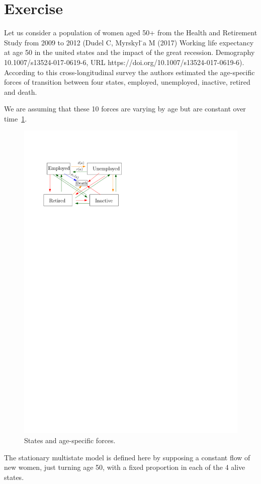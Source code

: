 \documentclass[11pt,letterpaper]{article}
\begin{document}
% 
% 
% 
% 
% 
\section*{Exercise }
Let us consider a population of women aged 50+ from the Health and
Retirement Study from 2009 to 2012 (Dudel C, Myrskyl ̈a M (2017)
Working life expectancy at age 50 in the united states and the impact
of the great recession. Demography 10.1007/s13524-017-0619-6, URL
https://doi.org/10.1007/s13524-017-0619-6). According to this
cross-longitudinal survey the authors estimated the age-specific forces of
transition between four states, employed, unemployed, inactive,
retired and death.

We are assuming that these 10 forces are varying by age but are constant
over time~\ref{f:forces-employment}.
 \begin{figure}[htbp]\centering
   \includegraphics[width=.5\textwidth]{forces-employment}
   \caption{\sf States and age-specific forces. }\label{f:forces-employment}
 \end{figure}
The stationary multistate model is defined here by
supposing a constant flow of new women, just turning age 50, with a
fixed proportion in each of the 4 alive states.
\end{document}
